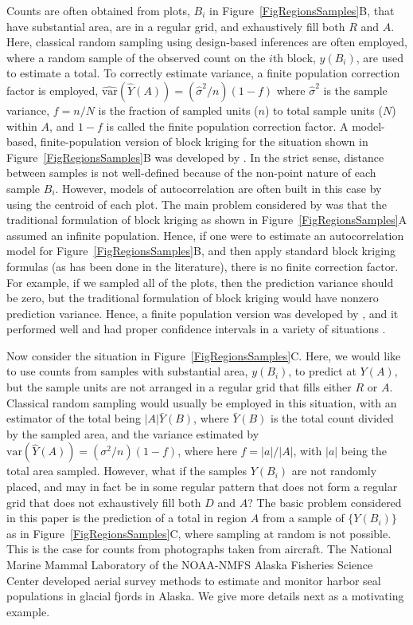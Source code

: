 \documentclass[12pt, titlepage]{article}\usepackage[]{graphicx}\usepackage[]{color}
\begin{document}
Counts are often obtained from plots, $B_i$ in Figure~\ref{FigRegionsSamples}B, that have substantial area, are in a regular grid, and exhaustively fill both $R$ and $A$. Here, classical random sampling using design-based inferences are often employed, where a random sample of the observed count on the $i$th block, $y(B_i)$, are used to estimate a total.  To correctly estimate variance, a finite population correction factor is employed, $\hat{\textrm{var}}(\hat{Y}(A)) = (\hat{\sigma}^2/n)(1-f)$ where $\hat{\sigma}^2$ is the sample variance, $f=n/N$ is the fraction of sampled units ($n$) to total sample units ($N$) within $A$, and $1 - f$ is called the finite population correction factor. A model-based, finite-population version of block kriging for the situation shown in Figure~\ref{FigRegionsSamples}B was developed by \citet{Ver:pred:2000, Ver:spat:2008}. In the strict sense, distance between samples is not well-defined because of the non-point nature of each sample $B_i$.  However, models of autocorrelation are often built in this case by using the centroid of each plot.  The main problem considered by \citet{Ver:pred:2000, Ver:spat:2008} was that the traditional formulation of block kriging as shown in Figure~\ref{FigRegionsSamples}A assumed an infinite population.  Hence, if one were to estimate an autocorrelation model for Figure~\ref{FigRegionsSamples}B, and then apply standard block kriging formulas (as has been done in the literature), there is no finite correction factor.  For example, if we sampled all of the plots, then the prediction variance should be zero, but the traditional formulation of block kriging would have nonzero prediction variance. Hence, a finite population version was developed  by \citet{Ver:pred:2000, Ver:spat:2008}, and it performed well and had proper confidence intervals in a variety of situations \citep{Ver:samp:2002}. 
  
Now consider the situation in Figure~\ref{FigRegionsSamples}C.  Here, we would like to use counts from samples with substantial area, $y(B_i)$, to predict at $Y(A)$, but the sample units are not arranged in a regular grid that fills either $R$ or $A$.  Classical random sampling would usually be employed in this situation, with an estimator of the total being $|A|\bar{Y}(B)$, where $\bar{Y}(B)$ is the total count divided by the sampled area, and the variance estimated by $\textrm{var}(\hat{Y}(A)) = (\sigma^2/n)(1-f)$, where here $f=|a|/|A|$, with $|a|$ being the total area sampled. However, what if the samples $Y(B_i)$ are not randomly placed, and may in fact be in some regular pattern that does not form a regular grid that does not exhaustively fill both $D$ and $A$?  The basic problem considered in this paper is the prediction of a total in region $A$ from a sample of $\{Y(B_i)\}$ as in Figure~\ref{FigRegionsSamples}C, where sampling at random is not possible. This is the case for counts from photographs taken from aircraft.  The National Marine Mammal Laboratory of the NOAA-NMFS Alaska Fisheries Science Center developed aerial survey methods to estimate and monitor harbor seal populations in glacial fjords in Alaska. We give more details next as a motivating example.
\end{document}
